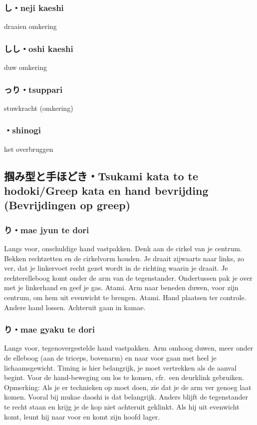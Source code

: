 \subsubsection{し・neji kaeshi}
draaien omkering

\subsubsection{しし・oshi kaeshi}
duw omkering

\subsubsection{っり・tsuppari}
stuwkracht (omkering)

\subsubsection{・shinogi}
het overbruggen

\subsection{掴み型と手ほどき・Tsukami kata to te hodoki/Greep kata en hand bevrijding (Bevrijdingen op greep)}
\subsubsection{り・mae jyun te dori}
Langs voor, onschuldige hand vastpakken. Denk aan de cirkel van je centrum. Bekken rechtzetten en de cirkelvorm houden.
Je draait zijwaarts naar links, zo ver, dat je linkervoet recht gezet wordt in de richting waarin je draait. Je rechterelleboog komt onder de arm van de tegenstander. Ondertussen pak je over met je linkerhand en geef je gas. Atami. Arm naar beneden duwen, voor zijn centrum, om hem uit evenwicht te brengen. Atami. Hand plaatsen ter controle. Andere hand lossen. Achteruit gaan in kamae.

\subsubsection{り・mae gyaku te dori}
Langs voor, tegenovergestelde hand vastpakken. Arm omhoog duwen, meer onder de elleboog (aan de triceps, bovenarm) en naar voor gaan met heel je lichaamsgewicht. Timing is hier belangrijk, je moet vertrekken als de aanval begint. Voor de hand-beweging om los te komen, cfr.\ een deurklink gebruiken.\\
\noindent Opmerking: Als je er technieken op moet doen, zie dat je de arm ver genoeg laat komen. Vooral bij mukae daoshi is dat belangrijk. Anders blijft de tegenstander te recht staan en krijg je de kop niet achteruit geklinkt. Als hij uit evenwicht komt, leunt hij naar voor en komt zijn hoofd lager.

